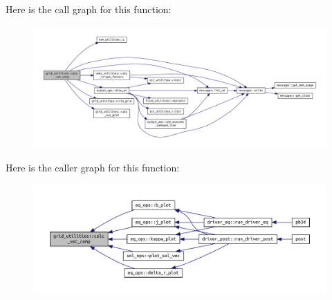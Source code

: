 Here is the call graph for this function\+:\nopagebreak
\begin{figure}[H]
\begin{center}
\leavevmode
\includegraphics[width=350pt]{namespacegrid__utilities_ad3d9386b9abcb1a7e17369a1b3a3750d_cgraph}
\end{center}
\end{figure}
Here is the caller graph for this function\+:\nopagebreak
\begin{figure}[H]
\begin{center}
\leavevmode
\includegraphics[width=350pt]{namespacegrid__utilities_ad3d9386b9abcb1a7e17369a1b3a3750d_icgraph}
\end{center}
\end{figure}
\mbox{\label{namespacegrid__utilities_a39e7cd9b8f173994358dbdd6b57827e1}} 
